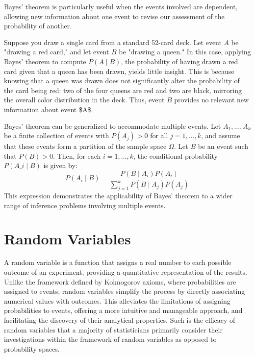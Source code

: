 Bayes' theorem is particularly useful when the events involved are dependent, allowing new information about one event to revise our assessment of the probability of another.

\begin{example}
Suppose you draw a single card from a standard 52-card deck. Let event $A$ be "drawing a red card," and let event $B$ be "drawing a queen." In this case, applying Bayes' theorem to compute $P(A \mid B)$, the probability of having drawn a red card given that a queen has been drawn, yields little insight. This is because knowing that a queen was drawn does not significantly alter the probability of the card being red: two of the four queens are red and two are black, mirroring the overall color distribution in the deck. Thus, event $B$ provides no relevant new information about event \$A\$.
\end{example}

Bayes' theorem can be generalized to accommodate multiple events. Let $A_{1}, \ldots, A_{k}$ be a finite collection of events with $P\left( A_{j} \right) > 0$ for all $j = 1, \ldots, k$, and assume that these events form a partition of the sample space $\Omega$. Let $B$ be an event such that $P\left(B\right) > 0$. Then, for each $i = 1, \ldots, k$, the conditional probability $P\left(A\_{i}\mid B\right)$ is given by:
\[
P\left(A_{i}\mid B\right)=\frac{P\left(B\mid A_{i}\right) P\left(A_{i}\right)}{\sum_{j=1}^{k} P\left(B \mid A_{j}\right) P\left(A_{j}\right)}
\]
This expression demonstrates the applicability of Bayes' theorem to a wider range of inference problems involving multiple events.

%
%

\section{Random Variables}
\label{sec:probability_random_variables}

A random variable is a function that assigns a real number to each possible outcome of an experiment, providing a quantitative representation of the results. Unlike the framework defined by Kolmogorov axioms, where probabilities are assigned to events, random variables simplify the process by directly associating numerical values with outcomes. This alleviates the limitations of assigning probabilities to events, offering a more intuitive and manageable approach, and facilitating the discovery of their analytical properties. Such is the efficacy of random variables that a majority of statisticians primarily consider their investigations within the framework of random variables as opposed to probability spaces.

